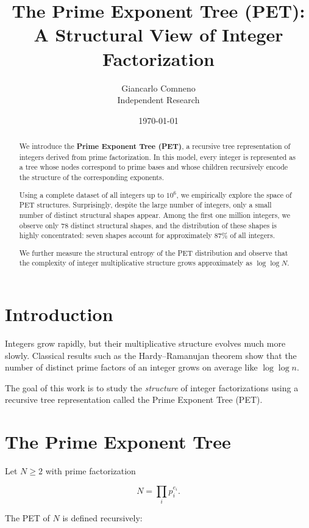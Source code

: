 \documentclass[11pt]{article}
\title{The Prime Exponent Tree (PET): \\
A Structural View of Integer Factorization}
\author{Giancarlo Comneno \\
\small Independent Research}
\date{\today}
\begin{document}
\maketitle

\begin{abstract}
We introduce the \textbf{Prime Exponent Tree (PET)}, a recursive tree representation
of integers derived from prime factorization. In this model, every integer is
represented as a tree whose nodes correspond to prime bases and whose children
recursively encode the structure of the corresponding exponents.

Using a complete dataset of all integers up to $10^6$, we empirically explore the
space of PET structures. Surprisingly, despite the large number of integers,
only a small number of distinct structural shapes appear. Among the first one
million integers, we observe only 78 distinct structural shapes, and the
distribution of these shapes is highly concentrated: seven shapes account for
approximately 87\% of all integers.

We further measure the structural entropy of the PET distribution and observe
that the complexity of integer multiplicative structure grows approximately as
$\log\log N$.
\end{abstract}

\section{Introduction}

Integers grow rapidly, but their multiplicative structure evolves much more
slowly. Classical results such as the Hardy--Ramanujan theorem show that the
number of distinct prime factors of an integer grows on average like
$\log\log n$.

The goal of this work is to study the \emph{structure} of integer
factorizations using a recursive tree representation called the
Prime Exponent Tree (PET).

\section{The Prime Exponent Tree}

Let $N \ge 2$ with prime factorization

\begin{equation}
N = \prod_i p_i^{e_i}.
\end{equation}

The PET of $N$ is defined recursively:
\end{document}
